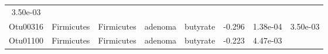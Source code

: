 \documentclass[11pt,]{article}
\begin{document}
\begin{longtable}[]{@{}cccccccc@{}}
\begin{minipage}[t]{0.08\columnwidth}
3.50e-03\strut
\end{minipage}\tabularnewline
\begin{minipage}[t]{0.08\columnwidth}\centering\strut
Otu00316\strut
\end{minipage} & \begin{minipage}[t]{0.15\columnwidth}\centering\strut
Firmicutes\strut
\end{minipage} & \begin{minipage}[t]{0.15\columnwidth}\centering\strut
Firmicutes\strut
\end{minipage} & \begin{minipage}[t]{0.08\columnwidth}\centering\strut
adenoma\strut
\end{minipage} & \begin{minipage}[t]{0.09\columnwidth}\centering\strut
butyrate\strut
\end{minipage} & \begin{minipage}[t]{0.07\columnwidth}\centering\strut
-0.296\strut
\end{minipage} & \begin{minipage}[t]{0.08\columnwidth}\centering\strut
1.38e-04\strut
\end{minipage} & \begin{minipage}[t]{0.08\columnwidth}\centering\strut
3.50e-03\strut
\end{minipage}\tabularnewline
\begin{minipage}[t]{0.08\columnwidth}\centering\strut
Otu01100\strut
\end{minipage} & \begin{minipage}[t]{0.15\columnwidth}\centering\strut
Firmicutes\strut
\end{minipage} & \begin{minipage}[t]{0.15\columnwidth}\centering\strut
Firmicutes\strut
\end{minipage} & \begin{minipage}[t]{0.08\columnwidth}\centering\strut
adenoma\strut
\end{minipage} & \begin{minipage}[t]{0.09\columnwidth}\centering\strut
butyrate\strut
\end{minipage} & \begin{minipage}[t]{0.07\columnwidth}\centering\strut
-0.223\strut
\end{minipage} & \begin{minipage}[t]{0.08\columnwidth}\centering\strut
4.47e-03\strut
\end{minipage} & \begin{minipage}[t]{0.08\columnwidth}\centering\strut

\end{minipage}
\end{longtable}
\end{document}
